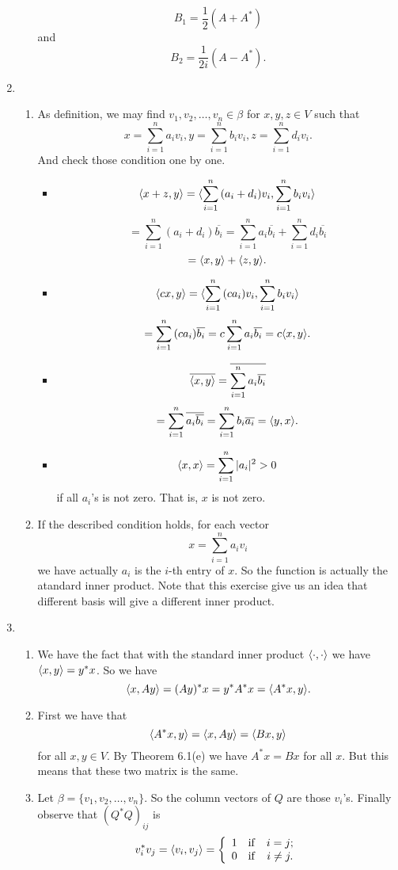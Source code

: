 \begin{enumerate}
\begin{enumerate}
\[B_1=\frac{1}{2}(A+A^*)\]
and 
\[B_2=\frac{1}{2i}(A-A^*).\]
\end{enumerate}
\item \begin{enumerate}
\item As definition, we may find $v_1,v_2,\ldots ,v_n\in \beta$ for $x,y,z\in V$ such that 
\[x=\sum_{i=1}^n{a_iv_i},y=\sum_{i=1}^n{b_iv_i},z=\sum_{i=1}^n{d_iv_i}.\]
And check those condition one by one.
\begin{itemize}
\item \[\langle x+z,y\rangle=\langle \sum_{i=1}^n{(a_i+d_i)v_i},\sum_{i=1}^n{b_iv_i}\rangle \]
\[=\sum_{i=1}^n{(a_i+d_i)\overline{b_i}}=\sum_{i=1}^n{a_i\overline{b_i}}+\sum_{i=1}^n{d_i\overline{b_i}}\]
\[=\langle x,y\rangle+\langle z,y\rangle.\]
\item \[\langle cx,y\rangle=\langle \sum_{i=1}^n{(ca_i)v_i},\sum_{i=1}^n{b_iv_i}\rangle \]
\[=\sum_{i=1}^n{(ca_i)\overline{b_i}}=c\sum_{i=1}^n{a_i\overline{b_i}}=c\langle x,y\rangle .\]
\item \[\overline{\langle x,y\rangle}=\overline{\sum_{i=1}^n{a_i\overline{b_i}}}\]
\[=\sum_{i=1}^n{\overline{a_i\overline{b_i}}}=\sum_{i=1}^n{b_i\overline{a_i}}=\langle y,x\rangle .\]
\item \[\langle x,x\rangle =\sum_{i=1}^n{|a_i|^2}>0\]
if all $a_i$'s is not zero. That is, $x$ is not zero.
\end{itemize}
\item If the described condition holds, for each vector 
\[x=\sum_{i=1}^n{a_iv_i}\] 
we have actually $a_i$ is the $i$-th entry of $x$. So the function is actually the atandard inner product. Note that this exercise give us an idea that different basis will give a different inner product.
\end{enumerate}
\item \begin{enumerate}
\item We have the fact that with the standard inner product $\langle \cdot, \cdot \rangle$ we have $\langle x,y\rangle=y^*x$. So we have 
\[\langle x,Ay\rangle =(Ay)^*x=y^*A^*x=\langle A^*x,y\rangle.\]
\item First we have that 
\[\langle A^*x,y\rangle =\langle x,Ay\rangle =\langle Bx,y\rangle \]
for all $x,y\in V$. By Theorem 6.1(e) we have $A^*x=Bx$ for all $x$. But this means that these two matrix is the same.
\item Let $\beta=\{v_1,v_2,\ldots ,v_n\}$. So the column vectors of $Q$ are those $v_i$'s. Finally observe that $(Q^*Q)_{ij}$ is 
\[v_i^*v_j=\langle v_i,v_j\rangle =\left\{\begin{array}{ccc}1&\mathrm{if} &i=j;\\0&\mathrm{if} &i\neq j.\end{array}\right.\]

\end{enumerate}
\end{enumerate}
